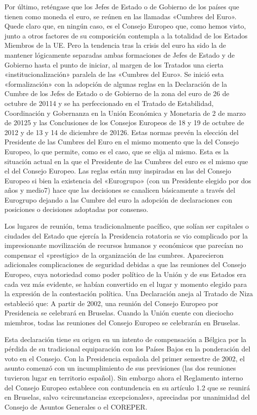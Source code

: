 \documentclass[10pt,a4paper]{article}
\begin{document}
Por último, reténgase que los Jefes de Estado o de Gobierno de los países que tienen como moneda el euro, se reúnen en las llamadas «Cumbres del Euro». Quede claro que, en ningún caso, es el Consejo Europeo que, como hemos visto, junto a otros factores de su composición contempla a la totalidad de los Estados Miembros de la UE. Pero la tendencia tras la crisis del euro ha sido la de mantener lógicamente separadas ambas formaciones de Jefes de Estado y de Gobierno hasta el punto de iniciar, al margen de los Tratados una cierta «institucionalización» paralela de las «Cumbres del Euro». Se inició esta «formalización» con la adopción de algunas reglas en la Declaración de la Cumbre de los Jefes de Estado o de Gobierno de la zona del euro de 26 de octubre de 20114 y se ha perfeccionado en el Tratado de Estabilidad, Coordinación y Gobernanza en la Unión Económica y Monetaria de 2 de marzo de 20125 y las Conclusiones de los Consejos Europeos de 18 y 19 de octubre de 2012 y de 13 y 14 de diciembre de 20126. Estas normas prevén la elección del Presidente de las Cumbres del Euro en el mismo momento que la del Consejo Europeo, lo que permite, como es el caso, que se elija al mismo. Esta es la situación actual en la que el Presidente de las Cumbres del euro es el mismo que el del Consejo Europeo. Las reglas están muy inspiradas en las del Consejo Europeo si bien la existencia del «Eurogrupo» (con un Presidente elegido por dos años y medio7) hace que las decisiones se canalicen básicamente a través del Eurogrupo dejando a las Cumbre del euro la adopción de declaraciones con posiciones o decisiones adoptadas por consenso.

Los lugares de reunión, tema tradicionalmente pacífico, que solían ser capitales o ciudades del Estado que ejercía la Presidencia rotatoria se vio complicado por la impresionante movilización de recursos humanos y económicos que parecían no compensar el «prestigio» de la organización de las cumbres. Aparecieron adicionales complicaciones de seguridad debidas a que las reuniones del Consejo Europeo, cuya notoriedad como poder político de la Unión y de sus Estados era cada vez más evidente, se habían convertido en el lugar y momento elegido para la expresión de la contestación política. Una Declaración aneja al Tratado de Niza estableció que: A partir de 2002, una reunión del Consejo Europeo por Presidencia se celebrará en Bruselas. Cuando la Unión cuente con dieciocho miembros, todas las reuniones del Consejo Europeo se celebrarán en Bruselas. 

Esta declaración tiene su origen en un intento de compensación a Bélgica por la pérdida de su tradicional equiparación con los Países Bajos en la ponderación del voto en el Consejo. Con la Presidencia española del primer semestre de 2002, el asunto comenzó con un incumplimiento de sus previsiones (las dos reuniones tuvieron lugar en territorio español). Sin embargo ahora el Reglamento interno del Consejo Europeo establece con contundencia en su artículo 1.2 que se reunirá en Bruselas, salvo «circunstancias excepcionales», apreciadas por unanimidad del Consejo de Asuntos Generales o el COREPER.
\end{document}
